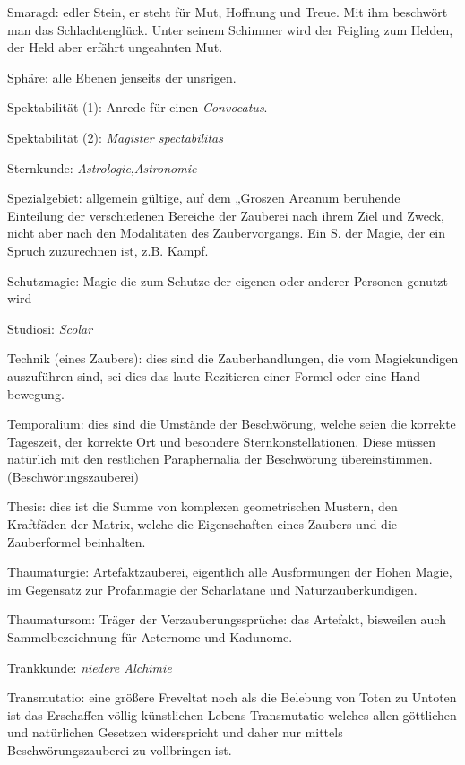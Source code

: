 \documentclass[a5paper,8pt]{book}
\begin{document}
\begin{small}
\begin{description}
 \item Smaragd: edler Stein, er steht für Mut, Hoffnung und Treue. Mit ihm beschwört man das Schlachtenglück. Unter seinem Schimmer wird der Feigling zum Helden, der Held aber erfährt ungeahnten Mut.
 \item Sphäre: alle Ebenen jenseits der unsrigen.
 \item Spektabilität (1): Anrede für einen \textit{Convocatus}.
 \item Spektabilität (2): \textit{Magister spectabilitas}
 \item Sternkunde: \textit{Astrologie},\textit{Astronomie}
 \item Spezialgebiet: allgemein gültige, auf dem „Groszen Arcanum beruhende Einteilung der verschiedenen Bereiche der Zauberei nach ihrem Ziel und Zweck, nicht aber nach den Modalitäten des Zaubervorgangs. Ein S. der Magie, der ein Spruch zuzurechnen ist, z.B. Kampf.
 \item Schutzmagie: Magie die zum Schutze der eigenen oder anderer Personen genutzt wird
 \item Studiosi: \textit{Scolar}
 \item Technik (eines Zaubers): dies sind die Zauber­hand­lungen, die vom Magiekundigen auszuführen sind, sei dies das laute Rezitieren einer Formel oder eine Hand­bewegung.
 \item Temporalium: dies sind die Umstände der Be­schwörung, welche seien die korrekte Tageszeit, der kor­rekte Ort und besondere Sternkonstellationen. Diese müs­sen natürlich mit den restlichen \textit{}Para­phernalia der Be­schwörung übereinstimmen. (\textit{}Beschwörungs­zauberei)
 \item Thesis: dies ist die Summe von komplexen geo­metrischen Mustern, den Kraftfäden der \textit{}Matrix, welche die Eigenschaften eines Zaubers und die Zauberformel beinhalten.
 \item Thaumaturgie: Artefaktzauberei, eigentlich alle Aus­formungen der Hohen Magie, im Gegensatz zur Profan­magie der Scharlatane und Naturzauberkundigen.
 \item Thaumatursom: Träger der Verzauberungssprüche: das Artefakt, bisweilen auch Sammelbezeichnung für \textit{}Aeternome und \textit{}Kadunome.
 \item Trankkunde: \textit{niedere Alchimie}
 \item Transmutatio: eine größere Freveltat noch als die Be­lebung von Toten zu Untoten ist das Erschaffen völlig künstlichen Lebens Transmutatio welches allen gött­lichen und natürlichen Gesetzen widerspricht und daher nur mittels \textit{}Beschwörungszauberei zu voll­bringen ist.

\end{description}
\end{small}
\end{document}
